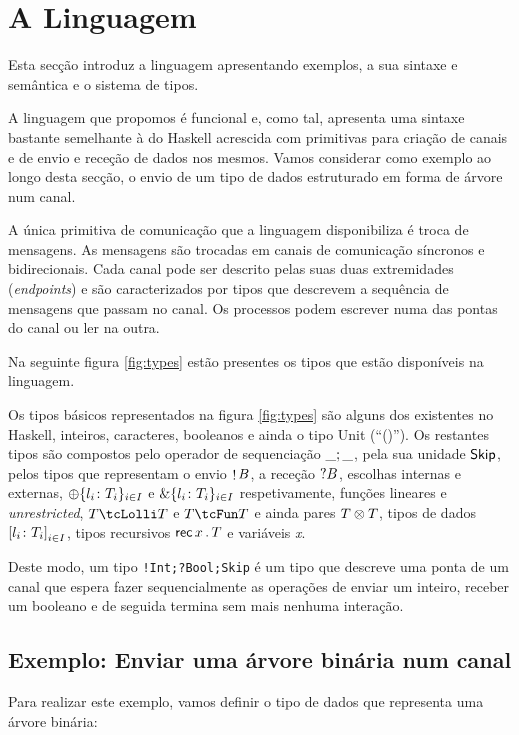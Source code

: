 \section{A Linguagem}
\lstset{language=CFST}
Esta secção introduz a linguagem apresentando exemplos, a sua sintaxe e semântica e o sistema de tipos. 

A linguagem que propomos é funcional e, como tal, apresenta uma sintaxe bastante semelhante à do Haskell acrescida com primitivas para criação de canais e de envio e receção de dados nos mesmos. Vamos considerar como exemplo ao longo desta secção, o envio de um tipo de dados estruturado em forma de árvore num canal.

A única primitiva de comunicação que a linguagem disponibiliza é troca de mensagens. As mensagens são trocadas em canais de comunicação síncronos e bidirecionais. Cada canal pode ser descrito pelas suas duas extremidades (\textit{endpoints}) e são caracterizados por tipos que descrevem a sequência de mensagens que passam no canal.
Os processos podem escrever numa das pontas do canal ou ler na outra.

Na seguinte figura \ref{fig:types} estão presentes os tipos que estão disponíveis na linguagem.



Os tipos básicos representados na figura \ref{fig:types} são alguns dos existentes no Haskell, inteiros, caracteres, booleanos e ainda o tipo Unit (``()''). Os restantes tipos são compostos pelo operador de sequenciação $\_;\_$, pela sua unidade $\mathsf{Skip}$, pelos tipos que representam o envio $\mathop! B$, a receção $?B$, escolhas internas e externas, $\oplus\{l_i\colon T_i\}_{i\in I}$ e $\&\{l_i\colon T_i\}_{i\in I}$ respetivamente, funções lineares e \textit{unrestricted}, $\tLinFun{T}{T}$ e $\tUnFun{T}{T}$ e ainda pares $T\otimes T$, tipos de dados ${[l_i\colon T_i]}_{i\in I}$, tipos recursivos $\mathsf{rec}\,x\,.\,T$ e variáveis \textit{x}.

Deste modo, um tipo \lstinline"!Int;?Bool;Skip" é um tipo que descreve uma ponta de um canal que espera fazer sequencialmente as operações de enviar um inteiro, receber um booleano e de seguida termina sem mais nenhuma interação.

\subsection{Exemplo: Enviar uma árvore binária num canal}
\label{sec:example}
Para realizar este exemplo, vamos definir o tipo de dados que representa uma árvore binária:

